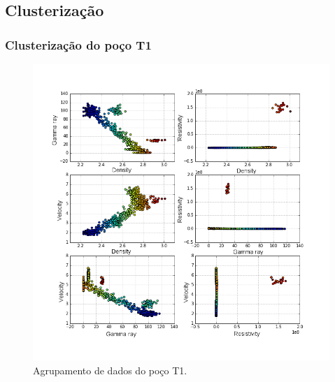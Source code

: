 \documentclass[aspectratio=10]{beamer} %
\begin{document}
\subsection{Clusterização}
\begin{frame}
\frametitle{Clusterização do poço T1}
\begin{figure}[H]
\centering
\includegraphics[scale=0.3]{Imagens/cluterpocoT1.png}
\caption{Agrupamento de dados do poço T1.}
\label{clusterT1}
\end{figure} 
\end{frame}
\end{document}
